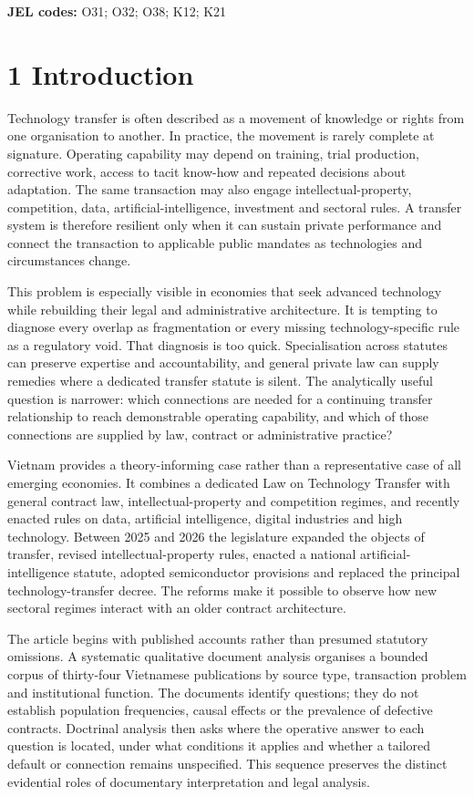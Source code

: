\documentclass[
]{article}
\begin{document}
\textbf{JEL codes:} O31; O32; O38; K12; K21

\section{1 Introduction}\label{introduction}

Technology transfer is often described as a movement of knowledge or
rights from one organisation to another. In practice, the movement is
rarely complete at signature. Operating capability may depend on
training, trial production, corrective work, access to tacit know-how
and repeated decisions about adaptation. The same transaction may also
engage intellectual-property, competition, data,
artificial-intelligence, investment and sectoral rules. A transfer
system is therefore resilient only when it can sustain private
performance and connect the transaction to applicable public mandates as
technologies and circumstances change.

This problem is especially visible in economies that seek advanced
technology while rebuilding their legal and administrative architecture.
It is tempting to diagnose every overlap as fragmentation or every
missing technology-specific rule as a regulatory void. That diagnosis is
too quick. Specialisation across statutes can preserve expertise and
accountability, and general private law can supply remedies where a
dedicated transfer statute is silent. The analytically useful question
is narrower: which connections are needed for a continuing transfer
relationship to reach demonstrable operating capability, and which of
those connections are supplied by law, contract or administrative
practice?

Vietnam provides a theory-informing case rather than a representative
case of all emerging economies. It combines a dedicated Law on
Technology Transfer with general contract law, intellectual-property and
competition regimes, and recently enacted rules on data, artificial
intelligence, digital industries and high technology. Between 2025 and
2026 the legislature expanded the objects of transfer, revised
intellectual-property rules, enacted a national artificial-intelligence
statute, adopted semiconductor provisions and replaced the principal
technology-transfer decree. The reforms make it possible to observe how
new sectoral regimes interact with an older contract architecture.

The article begins with published accounts rather than presumed
statutory omissions. A systematic qualitative document analysis
organises a bounded corpus of thirty-four Vietnamese publications by
source type, transaction problem and institutional function. The
documents identify questions; they do not establish population
frequencies, causal effects or the prevalence of defective contracts.
Doctrinal analysis then asks where the operative answer to each question
is located, under what conditions it applies and whether a tailored
default or connection remains unspecified. This sequence preserves the
distinct evidential roles of documentary interpretation and legal
analysis.
\end{document}
